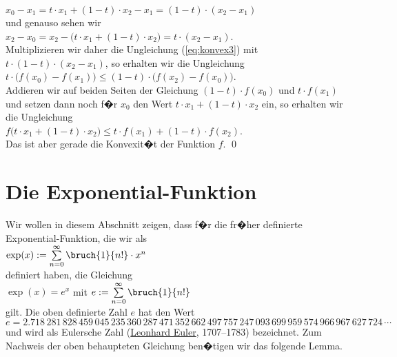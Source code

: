 \begin{enumerate}
  \hspace*{1.3cm}
  $x_0 - x_1 = t \cdot x_1 + (1 - t) \cdot x_2 - x_1 = (1-t) \cdot (x_2 - x_1)$
  \\[0.2cm]
  und genauso sehen wir
  \\[0.2cm]
  \hspace*{1.3cm}
  $x_2 - x_0 = x_2 - \bigl(t \cdot x_1 + (1 - t) \cdot x_2\bigr) = t \cdot (x_2 - x_1)$.
  \\[0.2cm]
  Multiplizieren wir daher die Ungleichung (\ref{eq:konvex3}) mit $t \cdot (1 - t) \cdot (x_2 -x_1)$, so
  erhalten wir die Ungleichung
  \\[0.2cm]
  \hspace*{1.3cm}
  $t \cdot \bigl(f(x_0) - f(x_1)\bigr) \leq (1 - t) \cdot \bigl(f(x_2) - f(x_0)\bigr)$.
  \\[0.2cm]
  Addieren wir auf beiden Seiten der Gleichung $(1 - t) \cdot f(x_0)$ und $t \cdot f(x_1)$
  und setzen dann noch f�r $x_0$ den Wert $t \cdot x_1 + (1-t)\cdot x_2$ ein, so erhalten wir
  die Ungleichung
  \\[0.2cm]
  \hspace*{1.3cm}
  $f\bigl(t \cdot x_1 + (1-t)\cdot x_2) \leq t \cdot f(x_1) + (1-t) \cdot f(x_2)$.
  \\[0.2cm]
  Das ist aber gerade die Konvexit�t der Funktion $f$. \qed
\end{enumerate}


\section{Die Exponential-Funktion}
Wir wollen in diesem Abschnitt zeigen, dass f�r die fr�her definierte
Exponential-Funktion, die wir als
\\[0.2cm]
\hspace*{1.3cm}
$\exp(x) := \sum\limits_{n=0}^\infty \bruch{1}{n!} \cdot x^{n}$ 
\\[0.2cm]
definiert haben, die Gleichung 
\\[0.2cm]
\hspace*{1.3cm}
$\exp(x) = e^x$ \quad mit $e := \sum\limits_{n=0}^\infty \bruch{1}{n!}$
\\[0.2cm]
gilt.  Die oben definierte Zahl $e$ hat den Wert
\\[0.2cm]
\hspace*{0.3cm}
$e = 2.718\,281\,828\,459\,045\,235\,360\,287\,471\,352\,662\,497\,757\,247\,093\,699\,959\,574\,966\,967\,627\,724\,\cdots$
\\[0.2cm]
und wird als Eulersche Zahl (\href{http://de.wikipedia.org/wiki/Leonhard_Euler}{Leonhard Euler},
1707--1783) bezeichnet.  Zum Nachweis der 
oben behaupteten Gleichung ben�tigen wir das folgende Lemma.


